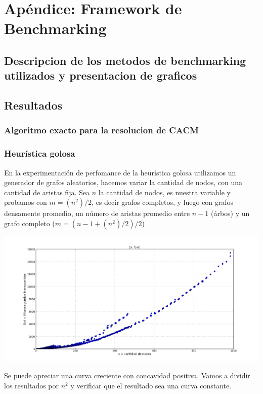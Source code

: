 \section{Ap\'endice: Framework de Benchmarking} \label{casos_de_prueba}
\subsection{Descripcion de los metodos de benchmarking utilizados y presentacion de graficos}
\subsection{Resultados}
\subsubsection{Algoritmo exacto para la resolucion de CACM}
\subsubsection{Heur\'istica golosa}

En la experimentaci\'on de perfomance de la heur\'istica golosa utilizamos un generador de grafos aleatorios, hacemos variar la cantidad de nodos, con una cantidad de aristas fija. Sea $n$ la cantidad de nodos, es nuestra variable y probamos con $m = (n^2)/2$, es decir grafos completos, y luego con grafos densamente promedio, un n\'umero de aristas promedio entre $n-1$ (\'arbos) y un grafo completo ($ m = (n - 1 + (n^2)/2) /2 $)

\begin{center}
\includegraphics[scale=0.40]{img/golosa_fx.png}
\end{center}
\vspace{2mm}

Se puede apreciar una curva creciente con concavidad positiva. Vamos a dividir los resultados por $n^2$ y verificar que el resultado sea una curva constante.


